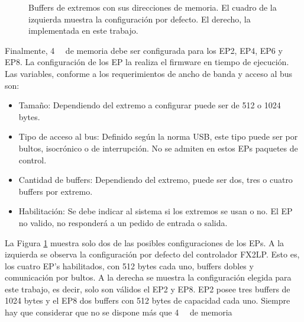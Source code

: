 \begin{figure}[t]
	\caption{Buffers de extremos con sus direcciones de memoria. El cuadro de la izquierda muestra la configuración por defecto. El derecho, la implementada en este trabajo.}
	\label{epbuf}
	\end{figure}
	
	Finalmente, \SI{4}{\kibi\byte} de memoria debe ser configurada para los EP2, EP4, EP6 y EP8. La configuración de los EP la realiza el firmware en tiempo de ejecución. Las variables, conforme a los requerimientos de ancho de banda y acceso al bus son:
	
	\begin{itemize}
		\item Tamaño: Dependiendo del extremo a configurar puede ser de 512 o 1024 bytes.
		\item Tipo de acceso al bus: Definido según la norma USB, este tipo puede ser por bultos, isocrónico o de interrupción. No se admiten en estos EPs paquetes de control.
		\item Cantidad de buffers: Dependiendo del extremo, puede ser dos, tres o cuatro buffers por extremo.
		\item Habilitación: Se debe indicar al sistema si los extremos se usan o no. El EP no valido, no responderá a un pedido de entrada o salida.
	\end{itemize}
	
	La Figura \ref{epbuf} muestra solo dos de las posibles configuraciones de los EPs. A la izquierda se observa la configuración por defecto del controlador FX2LP. Esto es, los cuatro EP's habilitados, con 512 bytes cada uno, buffers dobles y comunicación por bultos. A la derecha se muestra la configuración elegida para este trabajo, es decir, solo son válidos el EP2 y EP8. EP2 posee tres buffers de 1024 bytes y el EP8 dos buffers con 512 bytes de capacidad cada uno. Siempre hay que considerar que no se dispone más que \SI{4}{\kibi\byte} de memoria\\
	
